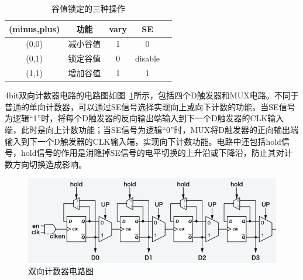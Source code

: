


\begin{table}[htbp]
    \caption{谷值锁定的三种操作}
    \label{tab:谷值锁定电路}
    \centering
    \belowrulesep=0pt  %
    \aboverulesep=0pt  %
        \begin{tabular}{|c|c|c|c|c|}
            \toprule
             (minus,plus) & 功能 & vary & SE \\
            \midrule
             (0,0)  & 减小谷值  & 1 &    0                   \\  \midrule
             (0,1)  & 锁定谷值  & 0 & disable                \\  \midrule
             (1,1)  & 增加谷值  & 1 &    1       \\          
            \bottomrule
        \end{tabular}
\end{table}

4bit双向计数器电路的电路图如图~\ref{fig:双向计数器电路}所示，包括四个D触发器和MUX电路。不同于普通的单向计数器，可以通过SE信号选择实现向上或向下计数的功能。当SE信号为逻辑“1”时，将每个D触发器的反向输出端输入到下一个D触发器的CLK输入端，此时是向上计数功能；当SE信号为逻辑“0”时，MUX将D触发器的正向输出端输入到下一个D触发器的CLK输入端，实现向下计数功能。电路中还包括hold信号，hold信号的作用是消隐掉SE信号的电平切换的上升沿或下降沿，防止其对计数方向切换造成影响。

\begin{figure}[htbp] 
    \centering
    \includegraphics[width=0.8\linewidth]{figures/双向计数器电路.png}
    \caption{双向计数器电路图}
    \label{fig:双向计数器电路}
\end{figure} 

